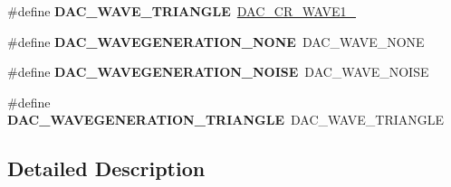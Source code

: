 \begin{DoxyCompactItemize}
\#define {\bfseries D\+A\+C\+\_\+\+W\+A\+V\+E\+\_\+\+T\+R\+I\+A\+N\+G\+LE}~\mbox{\hyperlink{group___peripheral___registers___bits___definition_ga48e167ae02d2ad5bc9fd30c2f8ea5b37}{D\+A\+C\+\_\+\+C\+R\+\_\+\+W\+A\+V\+E1\+\_}}
\item 
\mbox{\label{group___h_a_l___d_a_c___aliased___defines_ga646bbf1bac854ad6c65dcd932dd97057}} 
\#define {\bfseries D\+A\+C\+\_\+\+W\+A\+V\+E\+G\+E\+N\+E\+R\+A\+T\+I\+O\+N\+\_\+\+N\+O\+NE}~D\+A\+C\+\_\+\+W\+A\+V\+E\+\_\+\+N\+O\+NE
\item 
\mbox{\label{group___h_a_l___d_a_c___aliased___defines_ga983df0b8c271df50b8d230f9cd79b28e}} 
\#define {\bfseries D\+A\+C\+\_\+\+W\+A\+V\+E\+G\+E\+N\+E\+R\+A\+T\+I\+O\+N\+\_\+\+N\+O\+I\+SE}~D\+A\+C\+\_\+\+W\+A\+V\+E\+\_\+\+N\+O\+I\+SE
\item 
\mbox{\label{group___h_a_l___d_a_c___aliased___defines_ga157dcc41215ec9a313621a1b3e5ba1ab}} 
\#define {\bfseries D\+A\+C\+\_\+\+W\+A\+V\+E\+G\+E\+N\+E\+R\+A\+T\+I\+O\+N\+\_\+\+T\+R\+I\+A\+N\+G\+LE}~D\+A\+C\+\_\+\+W\+A\+V\+E\+\_\+\+T\+R\+I\+A\+N\+G\+LE
\end{DoxyCompactItemize}


\subsection{Detailed Description}
